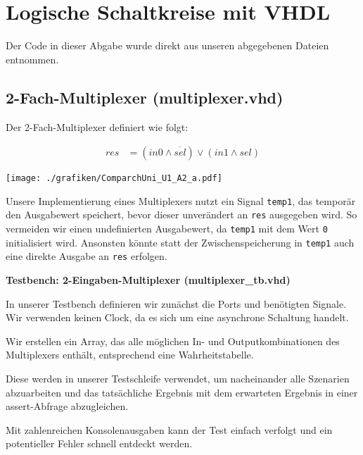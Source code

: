 \documentclass{pi3}
\begin{document}
\section{Logische Schaltkreise mit VHDL}

Der Code in dieser Abgabe wurde direkt aus unseren abgegebenen Dateien entnommen.

\subsection{2-Fach-Multiplexer (multiplexer.vhd)}

Der 2-Fach-Multiplexer definiert wie folgt:

\begin{align*}
res &= (in0 \wedge \overline{sel}) \vee (in1 \wedge sel)
\end{align*}

\begin{center}
	\texttt{[image: ./grafiken/ComparchUni\_U1\_A2\_a.pdf]}
\end{center} 

Unsere Implementierung eines Multiplexers nutzt ein Signal \texttt{temp1}, das temporär den Ausgabewert speichert, bevor dieser unverändert an \texttt{res} ausgegeben wird.
So vermeiden wir einen undefinierten Ausgabewert, da \texttt{temp1} mit dem Wert \texttt{0} initialisiert wird. 
Ansonsten könnte statt der Zwischenspeicherung in \texttt{temp1} auch eine direkte Ausgabe an \texttt{res} erfolgen.




\textbf{Testbench: 2-Eingaben-Multiplexer (multiplexer\_tb.vhd)}

In unserer Testbench definieren wir zunächst die Ports und benötigten Signale. Wir verwenden keinen Clock, da es sich um eine asynchrone Schaltung handelt.



Wir erstellen ein Array, das alle möglichen In- und Outputkombinationen des Multiplexers enthält, entsprechend eine Wahrheitstabelle.

Diese werden in unserer Testschleife verwendet, um nacheinander alle Szenarien abzuarbeiten und das tatsächliche Ergebnis mit dem erwarteten Ergebnis in einer assert-Abfrage abzugleichen.

Mit zahlenreichen Konsolenausgaben kann der Test einfach verfolgt und ein potentieller Fehler schnell entdeckt werden.
\end{document}
